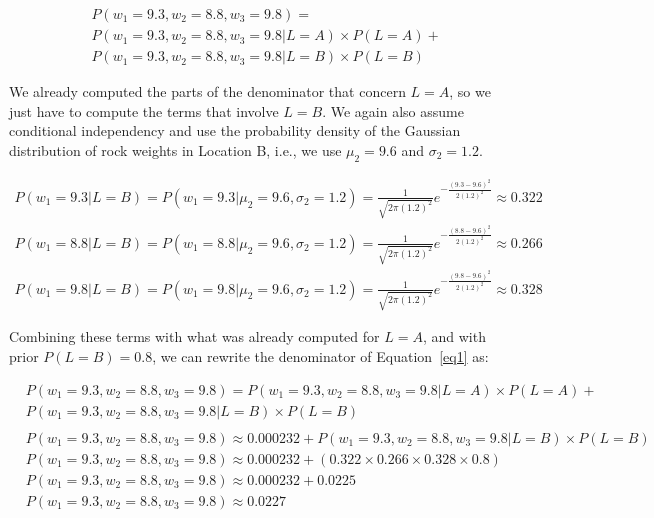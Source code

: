 \documentclass[leqno]{article}
\begin{document}
\begin{equation*}
\begin{split}
&P(w_1 = 9.3, w_2 = 8.8, w_3 = 9.8) = 
\\
&P(w_1 = 9.3, w_2 = 8.8, w_3 = 9.8| L = A) \times P(L = A) + 
\\
&P(w_1 = 9.3, w_2 = 8.8, w_3 = 9.8| L = B) \times P(L = B) 
\end{split}
\end{equation*}

\noindent We already computed the parts of the denominator that concern $L = A$, so we just have to compute the terms that involve $L = B$. We
again also assume conditional independency and use the probability density of the 
Gaussian distribution of rock weights in Location B, i.e., we use $\mu_2 = 9.6$ and $\sigma_2 = 1.2$.

\begin{equation*}
\begin{split}
P(w_1 = 9.3 | L = B) = P(w_1 = 9.3 | \mu_2 = 9.6, \sigma_2 = 1.2) = \frac{1}{\sqrt{2\pi(1.2)^2}}e^{-\frac{(9.3 - 9.6)^2}{2(1.2)^2}} \approx 0.322 
\\
P(w_1 = 8.8 | L = B) = P(w_1 = 8.8 | \mu_2 = 9.6, \sigma_2 = 1.2) = \frac{1}{\sqrt{2\pi(1.2)^2}}e^{-\frac{(8.8 - 9.6)^2}{2(1.2)^2}} \approx 0.266
\\
P(w_1 = 9.8 | L = B) = P(w_1 = 9.8 | \mu_2 = 9.6, \sigma_2 = 1.2) = \frac{1}{\sqrt{2\pi(1.2)^2}}e^{-\frac{(9.8 - 9.6)^2}{2(1.2)^2}} \approx 0.328
\end{split}
\end{equation*}

\noindent Combining these terms with what was already computed for $L = A$, and with prior $P(L = B) = 0.8$, we can rewrite the denominator of Equation~\ref{eq1} as:

\begin{equation*}
\begin{split}
&P(w_1 = 9.3, w_2 = 8.8, w_3 = 9.8) = P(w_1 = 9.3, w_2 = 8.8, w_3 = 9.8| L = A) \times P(L = A) + 
\\
&P(w_1 = 9.3, w_2 = 8.8, w_3 = 9.8| L = B) \times P(L = B)
\\
\\
&P(w_1 = 9.3, w_2 = 8.8, w_3 = 9.8) \approx 0.000232 + P(w_1 = 9.3, w_2 = 8.8, w_3 = 9.8| L = B) \times P(L = B)
\\
&P(w_1 = 9.3, w_2 = 8.8, w_3 = 9.8) \approx 0.000232 +  (0.322 \times 0.266 \times 0.328 \times 0.8)
\\
&P(w_1 = 9.3, w_2 = 8.8, w_3 = 9.8) \approx 0.000232 + 0.0225 
\\
&P(w_1 = 9.3, w_2 = 8.8, w_3 = 9.8) \approx 0.0227
\end{split}
\end{equation*}
\end{document}

